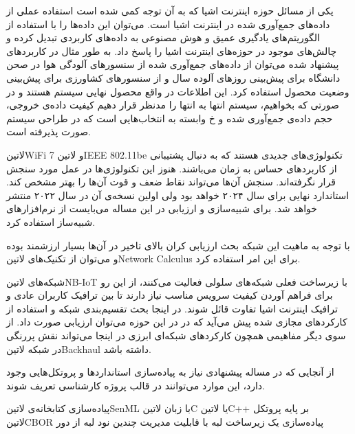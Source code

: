 
یکی از مسائل حوزه اینترنت اشیا که به آن توجه کمی شده است استفاده عملی از داده‌های جمع‌آوری شده در اینترنت اشیا است. می‌توان این داده‌ها را با استفاده از الگوریتم‌های یادگیری عمیق و هوش مصنوعی به داده‌های کاربردی تبدیل کرده
و چالش‌های موجود در حوزه‌های اینترنت اشیا را پاسخ داد. به طور مثال در کاربردهای پیشنهاد شده می‌توان از داده‌های جمع‌آوری شده از سنسورهای آلودگی هوا در صحن دانشگاه برای پیش‌بینی روزهای آلوده سال و از سنسورهای کشاورزی
برای پیش‌بینی وضعیت محصول استفاده کرد.
این اطلاعات در واقع محصول نهایی سیستم هستند و در صورتی که بخواهیم، سیستم انتها به انتها را مدنظر قرار دهیم کیفیت داده‌ی خروجی، حجم داده‌ی جمع‌آوری شده و ‌خ وابسته به انتخاب‌هایی است که در طراحی سیستم صورت پذیرفته است.


‌لاتین{WiFi 7} و ‌لاتین{IEEE 802.11be} تکنولوژی‌های جدیدی هستند که به دنبال پشتیبانی از کاربردهای حساس به زمان می‌باشند. هنوز این تکنولوژی‌ها در عمل مورد سنجش قرار نگرفته‌اند.
سنجش آن‌ها می‌تواند نقاط ضعف و قوت آن‌ها را بهتر مشخص کند. استاندارد نهایی برای سال ۲۰۲۴ خواهد بود ولی اولین نسخه‌ی آن در سال ۲۰۲۲ منتشر خواهد شد. برای شبیه‌سازی و ارزیابی در این
مساله می‌بایست از نرم‌افزارهای شبیه‌ساز استفاده کرد.

با توجه به ماهیت این شبکه بحث ارزیابی کران بالای تاخیر در آن‌ها بسیار ارزشمند بوده و می‌توان از تکنیک‌های ‌لاتین{Network Calculus} برای این امر استفاده کرد.


شبکه‌های ‌لاتین{NB-IoT} با زیرساخت فعلی شبکه‌های سلولی فعالیت می‌کنند، از این رو برای فراهم آوردن کیفیت سرویس مناسب نیاز دارند تا بین ترافیک کاربران عادی
و ترافیک اینترنت اشیا تفاوت قائل شوند. در اینجا بحث تقسیم‌بندی شبکه و استفاده از کارکردهای مجازی شده پیش می‌آید که در در این حوزه می‌توان ارزیابی صورت داد.
از سوی دیگر مفاهیمی همچون کارکردهای شبکه‌ای ابرزی در اینجا می‌تواند نقش پررنگی در شبکه ‌لاتین{Backhaul} داشته باشد.


از آنجایی که در مساله پیشنهادی نیاز به پیاده‌سازی استانداردها و پروتکل‌هایی وجود دارد، این موارد می‌توانند در قالب پروژه کارشناسی تعریف شوند.

 پیاده‌سازی کتابخانه‌ی ‌لاتین{SenML} با زبان ‌لاتین{C} یا ‌لاتین{C++} بر پایه پروتکل ‌لاتین{CBOR}
 پیاده‌سازی یک زیرساخت لبه با قابلیت مدیریت چندین نود لبه از دور

